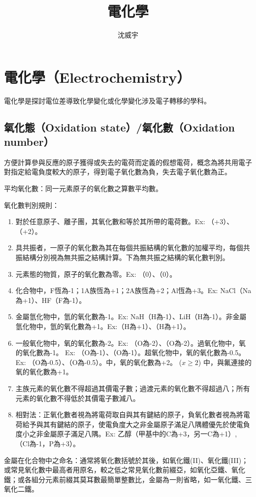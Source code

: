 \documentclass[a4paper,12pt]{article}
\begin{document}
\title{電化學}
\author{沈威宇}
\date{\temtoday}
\titletocdoc
\section{電化學（Electrochemistry）}
電化學是探討電位差導致化學變化或化學變化涉及電子轉移的學科。
\subsection{氧化態（Oxidation state）/氧化數（Oxidation number）}
方便計算參與反應的原子獲得或失去的電荷而定義的假想電荷，概念為將共用電子對指定給電負度較大的原子，得到電子氧化數為負，失去電子氧化數為正。

平均氧化數：同一元素原子的氧化數之算數平均數。

氧化數判別規則：
\begin{enumerate}
\item 對於任意原子、離子團，其氧化數和等於其所帶的電荷數。Ex: （+3）、（+2）。
\item 具共振者，一原子的氧化數為其在每個共振結構的氧化數的加權平均，每個共振結構分別視為無共振之結構計算。下為無共振之結構的氧化數判別。
\item 元素態的物質，原子的氧化數為零。Ex: （0）、（0）。
\item 化合物中，F恆為-1；1A族恆為+1；2A族恆為+2；Al恆為+3。Ex: NaCl（Na為+1）、HF（F為-1）。
\item 金屬氫化物中，氫的氧化數為-1。Ex: NaH（H為-1）、LiH（H為-1）。非金屬氫化物中，氫的氧化數為+1。Ex:（H為+1）、（H為+1）。
\item 一般氧化物中，氧的氧化數為-2。Ex: （O為-2）、（O為-2）。過氧化物中，氧的氧化數為-1。 Ex: （O為-1）、（O為-1）。超氧化物中，氧的氧化數為-0.5。 Ex: （O為-0.5）、（O為-0.5）。中，氧的氧化數為+2。 ($x\geq 2$) 中，與氟連接的氧的氧化數為+1。
\item 主族元素的氧化數不得超過其價電子數；過渡元素的氧化數不得超過八；所有元素的氧化數不得低於其價電子數減八。
\item 相對法：正氧化數者視為將電荷取自與其有鍵結的原子，負氧化數者視為將電荷給予與其有鍵結的原子，使電負度大之非金屬原子滿足八隅體優先於使電負度小之非金屬原子滿足八隅。Ex: 乙醇（甲基中的C為+3，另一C為+1）, （Cl為-1，P為+3）。
\end{enumerate}

金屬在化合物中之命名：通常將氧化數括號於其後，如氧化鐵(II)、氧化鐵(III)；或常見氧化數中最高者用原名，較之低之常見氧化數前綴亞，如氧化亞鐵、氧化鐵；或各組分元素前綴其莫耳數最簡單整數比，金屬為一則省略，如一氧化鐵、三氧化二鐵。
\end{document}
